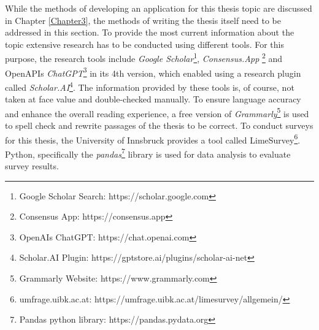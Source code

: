 While the methods of developing an application for this thesis topic are discussed
in Chapter \ref{Chapter3}, the methods of writing the thesis itself need 
to be addressed in this section.
To provide the most current information about the topic extensive 
research has to be conducted using different tools.
For this purpose, the research tools include 
\textit{Google Scholar}\footnote{Google Scholar Search: https://scholar.google.com}, 
\textit{Consensus.App} \footnote{Consensus App: https://consensus.app} and OpenAPIs 
\textit{ChatGPT}\footnote{OpenAIs ChatGPT: https://chat.openai.com} in its 4th version, which 
enabled using a research plugin called 
\textit{Scholar.AI}\footnote{Scholar.AI Plugin: https://gptstore.ai/plugins/scholar-ai-net}.
The information provided by these tools is,
of course, not taken at face value and double-checked manually. 
To ensure language accuracy and enhance the overall reading experience, a free version of 
\textit{Grammarly}\footnote{Grammarly Website: https://www.grammarly.com} is 
used to spell check and rewrite passages
of the thesis to be correct.
To conduct surveys for this thesis, the University of Innsbruck provides a tool called
LimeSurvey\footnote{umfrage.uibk.ac.at: https://umfrage.uibk.ac.at/limesurvey/allgemein/}.
Python, specifically the \textit{pandas}\footnote{Pandas python library: https://pandas.pydata.org} 
library is used for data analysis to evaluate survey results.
